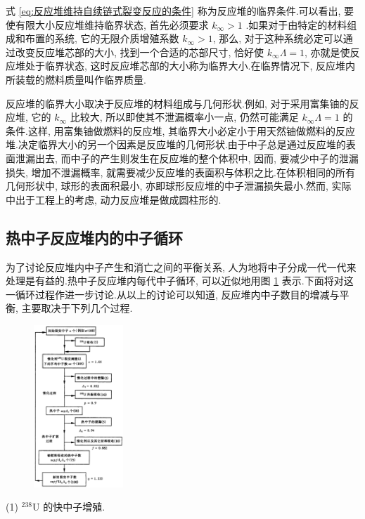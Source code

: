 \documentclass{Sichuan Normal University}
\begin{document}
式 \eqref{eq:反应堆维持自续链式裂变反应的条件} 称为反应堆的临界条件.可以看出, 要使有限大小反应堆维持临界状态, 首先必须要求 $k_{\infty}>1$ .如果对于由特定的材料组成和布置的系统, 它的无限介质增殖系数 $k_{\infty}>1$, 那么, 对于这种系统必定可以通过改变反应堆芯部的大小, 找到一个合适的芯部尺寸, 恰好使 $k_{\infty} \Lambda=1$, 亦就是使反应堆处于临界状态, 这时反应堆芯部的大小称为临界大小.在临界情况下, 反应堆内所装载的燃料质量叫作临界质量.

反应堆的临界大小取决于反应堆的材料组成与几何形状.例如, 对于采用富集铀的反应堆, 它的 $k_{\infty}$ 比较大, 所以即使其不泄漏概率小一点, 仍然可能满足 $k_{\infty} \Lambda=1$ 的条件.这样, 用富集铀做燃料的反应堆, 其临界大小必定小于用天然铀做燃料的反应堆.决定临界大小的另一个因素是反应堆的几何形状.由于中子总是通过反应堆的表面泄漏出去, 而中子的产生则发生在反应堆的整个体积中, 因而, 要减少中子的泄漏损失, 增加不泄漏概率, 就需要减少反应堆的表面积与体积之比.在体积相同的所有几何形状中, 球形的表面积最小, 亦即球形反应堆的中子泄漏损失最小.然而, 实际中出于工程上的考虑, 动力反应堆是做成圆柱形的.
\subsection{热中子反应堆内的中子循环}
为了讨论反应堆内中子产生和消亡之间的平衡关系, 人为地将中子分成一代一代来处理是有益的.热中子反应堆内每代中子循环, 可以近似地用图 \ref{fig:热中子反应堆内的中子平衡} 表示.下面将对这一循环过程作进一步讨论.从以上的讨论可以知道, 反应堆内中子数目的增减与平衡, 主要取决于下列几个过程.
\begin{figure}
    \centering
    \includegraphics[width=0.3\textwidth]{./figure/热中子反应堆内的中子平衡.png} %
    \vspace{3mm}
    \label{fig:热中子反应堆内的中子平衡}
  \end{figure}
(1) ${ }^{238} \mathrm{U}$ 的快中子增殖.
\end{document}

